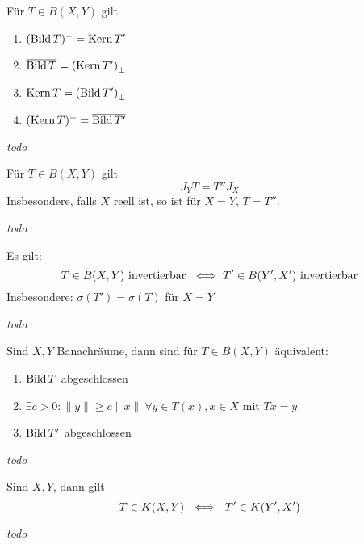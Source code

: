 \newpage %

\begin{prop}
	Für $T \in B(X, Y)$ gilt
	\begin{enumerate}[label=(\roman*\upshape)]
		\item $\left( \mathop{\rm Bild}\nolimits T \right)^{\bot} = \mathop{\rm Kern}\nolimits T'$
		\item $\overline{\mathop{\rm Bild}\nolimits T} = \left( \mathop{\rm Kern}\nolimits T' \right)_{\bot}$
		\item $\mathop{\rm Kern}\nolimits T = \left( \mathop{\rm Bild}\nolimits T' \right)_{\bot}$
		\item $\left( \mathop{\rm Kern}\nolimits T \right)^{\bot} = \overline{\mathop{\rm Bild}\nolimits T'}$
	\end{enumerate}
\end{prop}

\begin{beweis}
	\textit{todo} %
\end{beweis}


\begin{prop}
	Für $T \in B(X, Y)$ gilt
	\[ J_{Y} T = T'' J_{X} \]
	Insbesondere, falls $X$ reell ist, so ist für $X = Y$, $T = T''$.
\end{prop}

\begin{beweis}
	\textit{todo} %
\end{beweis}


\begin{satz}
	Es gilt:
	\[ T \in B(X, Y) \text{ invertierbar } \iff T' \in B(Y', X') \text{ invertierbar} \]
	Insbesondere: $\sigma(T') = \sigma(T)$ für $X = Y$
\end{satz}

\begin{beweis}
	\textit{todo} %
\end{beweis}


\begin{satz} 
	Sind $X, Y$ Banachräume, dann sind für $T \in B(X, Y)$  äquivalent:
	\begin{enumerate}[label=(\roman*\upshape)]
		\item $\mathop{\rm Bild}\nolimits T$ abgeschlossen
		\item $\exists c > 0 : \| y \| \geq c \| x \| ~ \forall y \in T(x), x \in X$ mit $T x = y$
		\item $\mathop{\rm Bild}\nolimits T'$ abgeschlossen
	\end{enumerate}
\end{satz}

\begin{beweis}
	\textit{todo} %
\end{beweis}


\begin{satz}[Schauder] 
	Sind $X, Y$,  dann gilt
	\[ T \in K(X, Y) ~ \iff ~ T' \in K(Y', X') \]
\end{satz}

\begin{beweis}
	\textit{todo} %
\end{beweis}


\newpage
